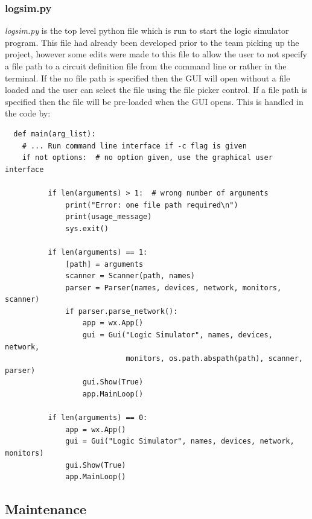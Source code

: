 \documentclass{article}					%
\begin{document}
\subsubsection{logsim.py}
\textit{logsim.py} is the top level python file which is run to start the logic simulator program. This file had already been developed prior to the team picking up the project, however some edits were made to this file to allow the user to not specify a file path to a circuit definition file from the command line or rather in the terminal. If the no file path is specified then the GUI will open without a file loaded and the user can select the file using the file picker control. If a file path is specified then the file will be pre-loaded when the GUI opens. This is handled in the code by:
\begin{verbatim}
  def main(arg_list):
    # ... Run command line interface if -c flag is given
    if not options:  # no option given, use the graphical user interface

          if len(arguments) > 1:  # wrong number of arguments
              print("Error: one file path required\n")
              print(usage_message)
              sys.exit()

          if len(arguments) == 1:
              [path] = arguments
              scanner = Scanner(path, names)
              parser = Parser(names, devices, network, monitors, scanner)
              if parser.parse_network():
                  app = wx.App()
                  gui = Gui("Logic Simulator", names, devices, network,
                            monitors, os.path.abspath(path), scanner, parser)
                  gui.Show(True)
                  app.MainLoop()

          if len(arguments) == 0:
              app = wx.App()
              gui = Gui("Logic Simulator", names, devices, network, monitors)
              gui.Show(True)
              app.MainLoop()
\end{verbatim}
\subsection{Maintenance}
\end{document}
